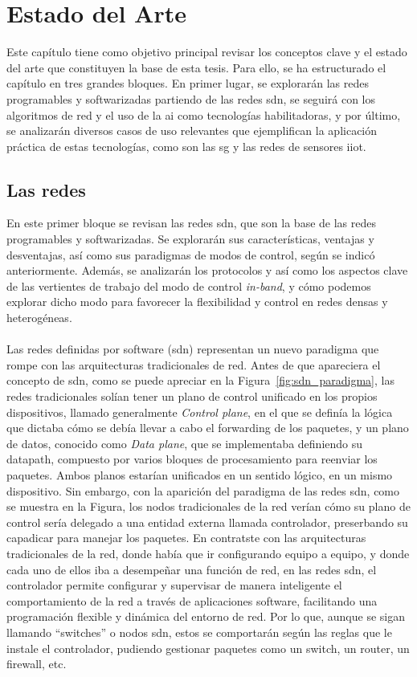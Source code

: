 \chapter{Estado del Arte}
\label{ch:sota}

Este capítulo tiene como objetivo principal revisar los conceptos clave y el estado del arte que constituyen la base de esta tesis. Para ello, se ha estructurado el capítulo en tres grandes bloques. En primer lugar, se explorarán las redes programables y softwarizadas partiendo de las redes \gls{sdn}, se seguirá con los algoritmos de red y el uso de la \gls{ai} como tecnologías habilitadoras, y por último, se analizarán diversos casos de uso relevantes que ejemplifican la aplicación práctica de estas tecnologías, como son las \gls{sg} y las redes de sensores \gls{iiot}. 

\section{Las redes }
\label{sec:redes_sdn} 

En este primer bloque se revisan las redes \gls{sdn}, que son la base de las redes programables y softwarizadas. Se explorarán sus características, ventajas y desventajas, así como sus paradigmas de modos de control, según se indicó anteriormente. Además, se analizarán los protocolos y así como los aspectos clave de las vertientes de trabajo del modo de control \textit{in-band}, y cómo podemos explorar dicho modo para favorecer la flexibilidad y control en redes densas y heterogéneas.\\
\\
Las redes definidas por software (\gls{sdn}) representan un nuevo paradigma que rompe con las arquitecturas tradicionales de red. Antes de que apareciera el concepto de \gls{sdn}, como se puede apreciar en la Figura~\ref{fig:sdn_paradigma}, las redes tradicionales solían tener un plano de control unificado en los propios dispositivos, llamado generalmente \textit{Control plane}, en el que se definía la lógica que dictaba cómo se debía llevar a cabo el forwarding de los paquetes, y un plano de datos, conocido como \textit{Data plane}, que se implementaba definiendo su datapath, compuesto por varios bloques de procesamiento para reenviar los paquetes. Ambos planos estarían unificados en un sentido lógico, en un mismo dispositivo. Sin embargo, con la aparición del paradigma de las redes \gls{sdn}, como se muestra en la Figura, los nodos tradicionales de la red verían cómo su plano de control sería delegado a una entidad externa llamada controlador, preserbando su capadicar para manejar los paquetes. En contratste con las arquitecturas tradicionales de la red, donde había que ir configurando equipo a equipo, y donde cada uno de ellos iba a desempeñar una función de red, en las redes \gls{sdn}, el controlador permite configurar y supervisar de manera inteligente el comportamiento de la red a través de aplicaciones software, facilitando una programación flexible y dinámica del entorno de red. Por lo que, aunque se sigan llamando ``switches'' o nodos \gls{sdn}, estos se comportarán según las reglas que le instale el controlador, pudiendo gestionar paquetes como un switch, un router, un firewall, etc. 

